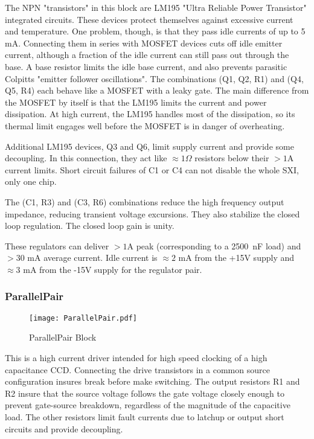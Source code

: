 The NPN "transistors" in this block are LM195 "Ultra Reliable Power Transistor" integrated circuits. These devices protect themselves against excessive current and temperature. One problem, though, is that they pass idle currents of up to 5 mA. Connecting them in series with MOSFET devices cuts off idle emitter current, although a fraction of the idle current can still pass out through the base. A base resistor limits the idle base current, and also prevents parasitic Colpitts "emitter follower oscillations". The combinations (Q1, Q2, R1) and (Q4, Q5, R4) each behave like a MOSFET with a leaky gate. The main difference from the MOSFET by itself is that the LM195 limits the current and power dissipation. At high current, the LM195 handles most of the dissipation, so its thermal limit engages well before the MOSFET  is in danger of overheating.

Additional LM195 devices, Q3 and Q6, limit supply current and provide some decoupling. In this connection, they act like $\approx 1\Omega$ resistors below their $>1$A current limits. Short circuit failures of C1 or C4 can not disable the whole SXI, only one chip.

The (C1, R3) and (C3, R6) combinations reduce the high frequency output impedance, reducing transient voltage excursions. They also stabilize the closed loop regulation. The closed loop gain is unity.

These regulators can deliver $>1$A peak (corresponding to a 2500\ nF load) and $>30$ mA average current. Idle current is  $\approx 2$ mA from the +15V supply and $\approx 3$ mA from the -15V supply for the regulator pair.

\subsubsection{ParallelPair}

   \begin{figure}
   \begin{center}
   \texttt{[image: ParallelPair.pdf]}
   \end{center}
   \caption{ParallelPair Block}
   \end{figure}

This is a high current driver intended for high speed clocking of a high capacitance CCD. Connecting the drive transistors in a common source configuration insures break before make switching. The output resistors R1 and R2 insure that the source voltage follows the gate voltage closely enough to prevent gate-source breakdown, regardless of the magnitude of the capacitive load. The other resistors limit fault currents due to latchup or output short circuits and provide decoupling.

